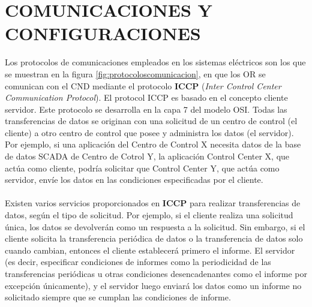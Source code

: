 \documentclass[a5paper]{book}%
\begin{document}
\chapter{COMUNICACIONES Y CONFIGURACIONES}

Los protocolos de comunicaciones empleados en los sistemas eléctricos son los que se muestran en la figura \ref{fig:protocoloscomunicacion}, en que los OR se comunican con el \ac{CND} mediante el protocolo \textbf{ICCP} (\textit{Inter Control Center Communication Protocol}). El protocol ICCP  es basado en el concepto cliente servidor. Este protocolo se desarrolla en la capa 7 del modelo OSI. Todas las transferencias de datos se originan con una solicitud de un centro de control (el cliente) a otro centro de control que posee y administra los datos (el servidor). Por ejemplo, si una aplicación del Centro de Control X necesita datos de la base de datos SCADA de Centro de Cotrol Y, la aplicación Control Center X, que actúa como cliente, podría solicitar que Control Center Y, que actúa como servidor, envíe los datos en las condiciones especificadas por el cliente.\\\\

Existen varios servicios proporcionados en \textbf{ICCP} para realizar transferencias de datos, según el tipo de solicitud. Por ejemplo, si el cliente realiza una solicitud única, los datos se devolverán como un respuesta a la solicitud. Sin embargo, si el cliente solicita la transferencia periódica de datos o la transferencia de datos solo cuando cambian, entonces el cliente establecerá primero el informe. El servidor (es decir, especificar condiciones de informes como la periodicidad de las transferencias periódicas u otras condiciones desencadenantes como el informe por excepción únicamente), y el servidor luego enviará los datos como un informe no solicitado siempre que se cumplan las condiciones de informe.\\\\
\end{document}
